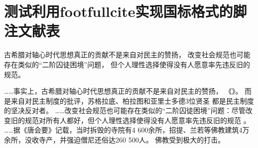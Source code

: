 \documentclass{article}
\begin{document}
\section{测试利用footfullcite实现国标格式的脚注文献表}

\begin{minipage}{0.9\linewidth}
\begin{refsection}

古希腊对轴心时代思想真正的贡献不是来自对民主的赞扬，
改变社会规范也可能存在类似的“二阶囚徒困境”问题，
但个人理性选择使得没有人愿意率先违反旧的规范。


\printbibliography[heading=subbibliography]
\end{refsection}
\end{minipage}

\vspace{2cm}


\begin{refsection}
……事实上，古希腊对轴心时代思想真正的贡献不是来自对民主的赞扬，
《》。
而是来自对民主制度的批评，苏格拉底、柏拉图和亚里士多德3位贤圣
都是民主制度的坚决反对者。
……改变社会规范也可能存在类似的“二阶囚徒困境”问题：尽管改变旧的规范对所有人都好，但个人理性选择使得没有人愿意率先违反旧的规范
。
……据《唐会要》记载，当时拆毁的寺院有4 600余所，招提、兰若等佛教建筑4万余所，没收寺产，并强迫僧尼还俗达260 500人。
佛教受到极大的打击。

\printbibliography[heading=subbibliography]
\end{refsection}
\end{document}
